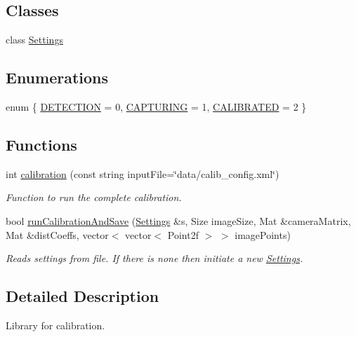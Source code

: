 \subsection*{Classes}
\begin{DoxyCompactItemize}
\item 
class \mbox{\hyperlink{class_settings}{Settings}}
\end{DoxyCompactItemize}
\subsection*{Enumerations}
\begin{DoxyCompactItemize}
\item 
enum \{ \mbox{\hyperlink{calibration_8hh_a06fc87d81c62e9abb8790b6e5713c55ba167a7ee1aabe9f27e010fff93c0ba971}{D\+E\+T\+E\+C\+T\+I\+ON}} = 0, 
\mbox{\hyperlink{calibration_8hh_a06fc87d81c62e9abb8790b6e5713c55ba53f5d985011ab26db21516188f46a94f}{C\+A\+P\+T\+U\+R\+I\+NG}} = 1, 
\mbox{\hyperlink{calibration_8hh_a06fc87d81c62e9abb8790b6e5713c55baf7834eaf5a327e180e039aa05dd3ebd1}{C\+A\+L\+I\+B\+R\+A\+T\+ED}} = 2
 \}
\end{DoxyCompactItemize}
\subsection*{Functions}
\begin{DoxyCompactItemize}
\item 
int \mbox{\hyperlink{calibration_8hh_a9deafd96b6adbc102c47af08cde6610c}{calibration}} (const string input\+File=\char`\"{}data/calib\+\_\+config.\+xml\char`\"{})
\begin{DoxyCompactList}\small\item\em Function to run the complete calibration. \end{DoxyCompactList}\item 
bool \mbox{\hyperlink{calibration_8hh_ac7558c8da6af683fc1c86c2ede7bb31c}{run\+Calibration\+And\+Save}} (\mbox{\hyperlink{class_settings}{Settings}} \&s, Size image\+Size, Mat \&camera\+Matrix, Mat \&dist\+Coeffs, vector$<$ vector$<$ Point2f $>$ $>$ image\+Points)
\begin{DoxyCompactList}\small\item\em Reads settings from file. If there is none then initiate a new {\ttfamily \mbox{\hyperlink{class_settings}{Settings}}}. \end{DoxyCompactList}\end{DoxyCompactItemize}


\subsection{Detailed Description}
Library for calibration. 



